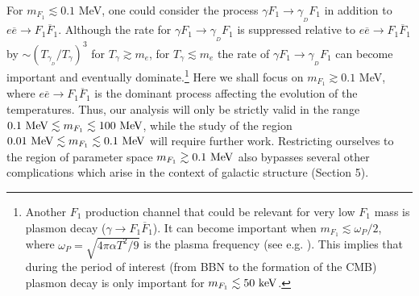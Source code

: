 \documentclass[12pt]{article}
\begin{document}
For $m _{F_1} \lesssim 0.1$ MeV, one could consider the process $\gamma F _1 \rightarrow \gamma _{_D}F _1$ in addition to $e\overline{e} \rightarrow F _1\overline{F} _1$. Although the rate for $\gamma F_1 \rightarrow \gamma _{_D}F _1$ is suppressed relative to $e\overline{e} \rightarrow F_1 \overline{F} _1$ by $\sim \left ( T _{\gamma _{_D}}/T _{\gamma} \right ) ^3$ for $T _{\gamma} \gtrsim m _e$, for $T _{\gamma} \lesssim m _e$ the rate of $\gamma F_1 \rightarrow \gamma _{_D}F _1$ can become important and eventually dominate.\footnote{Another $F_1$ production channel that could be relevant for very low $F_1$ mass is plasmon decay ($\gamma \rightarrow F _1\overline{F} _1$). It can become important when $m _{F_1} \lesssim \omega _P/2$, where $\omega _P = \sqrt{4\pi\alpha T ^2/9}$ is the plasma frequency (see e.g. \cite{updated}). This implies that during the period of interest (from BBN to the formation of the CMB) plasmon decay is only important for $m _{F_1} \lesssim 50 \ {\rm keV}$.} Here we shall focus on $m _{F_1} \gtrsim 0.1$ MeV, where $e\overline{e} \rightarrow F _1\overline{F} _1$ is the dominant process affecting the evolution of the temperatures. Thus, our analysis will only be strictly valid in the range $0.1 \ {\rm MeV} \lesssim m _{F_1} \lesssim 100 \ {\rm MeV}$, while the study of the region $0.01 \ {\rm MeV} \lesssim m _{F_1} \lesssim 0.1 \ {\rm MeV}$ will require further work. Restricting ourselves to the region of parameter space $m _{F_1} \gtrsim 0.1 \ {\rm MeV}$ also bypasses several other complications which arise in the context of galactic structure (Section 5).
\end{document}
